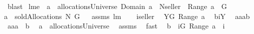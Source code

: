 \begin{isabellebody}
\ blast%
\endisatagproof
{\isafoldproof}%
%
\isadelimproof
%
\endisadelimproof
\isanewline
\isanewline
{}\isamarkupfalse%
\ lm{}{}e{\isacharcolon}\ \ {\isachardoublequoteopen}a\ {\isasymin}\ allocationsUniverse{\isachardoublequoteclose}\ {\isachardoublequoteopen}Domain\ a\ {\isasymsubseteq}\ N{\isacharminus}{\isacharbraceleft}seller{\isacharbraceright}{\isachardoublequoteclose}\ {\isachardoublequoteopen}{\isasymUnion}\ Range\ a\ {\isasymsubseteq}\ G{\isachardoublequoteclose}\ \isanewline
{\isachardoublequoteopen}a\ {\isasymin}\ soldAllocations{\isacharprime}{\isacharprime}\ N\ G{\isachardoublequoteclose}%
\isadelimproof
\ %
\endisadelimproof
%
\isatagproof
{}\isamarkupfalse%
\ assms\ lm{}{}\ \isanewline
{}\isamarkupfalse%
\ {\isacharminus}\isanewline
{}\isamarkupfalse%
\ {\isacharquery}i{\isacharequal}{\isachardoublequoteopen}seller{\isachardoublequoteclose}\ \isamarkupfalse%
\ {\isacharquery}Y{\isacharequal}{\isachardoublequoteopen}{\isacharbraceleft}G{\isacharminus}{\isasymUnion}\ Range\ a{\isacharbraceright}{\isacharminus}{\isacharbraceleft}{\isacharbraceleft}{\isacharbraceright}{\isacharbraceright}{\isachardoublequoteclose}\ \isamarkupfalse%
\ {\isacharquery}b{\isacharequal}{\isachardoublequoteopen}{\isacharbraceleft}{\isacharquery}i{\isacharbraceright}{\isasymtimes}{\isacharquery}Y{\isachardoublequoteclose}\ \isamarkupfalse%
\ {\isacharquery}aa{\isacharequal}{\isachardoublequoteopen}a{\isasymunion}{\isacharquery}b{\isachardoublequoteclose}\isanewline
{}\isamarkupfalse%
\ {\isacharquery}aa{\isacharprime}{\isacharequal}{\isachardoublequoteopen}a\ {\isacharplus}{\isacharasterisk}\ {\isacharquery}b{\isachardoublequoteclose}\ \isanewline
{}\isamarkupfalse%
\isanewline
{}{\isacharcolon}\ {\isachardoublequoteopen}a\ {\isasymin}\ allocationsUniverse{\isachardoublequoteclose}\ \isamarkupfalse%
\ assms{\isacharparenleft}{}{\isacharparenright}\ \isamarkupfalse%
\ fast\ \isanewline
{}\isamarkupfalse%
\ {\isachardoublequoteopen}{\isacharquery}b\ {\isasymsubseteq}\ {\isacharbraceleft}{\isacharparenleft}{\isacharquery}i{\isacharcomma}G{\isacharminus}{\isasymUnion}\ Range\ a{\isacharparenright}{\isacharbraceright}\ {\isacharminus}\ {\isacharbraceleft}{\isacharparenleft}{\isacharquery}i{\isacharcomma}\ {\isacharbraceleft}{\isacharbraceright}{\isacharparenright}{\isacharbraceright}{\isachardoublequoteclose}\ \isamarkupfalse%

\end{isabellebody}

